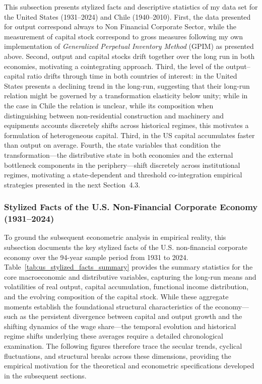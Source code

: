 This subsection presents stylized facts and descriptive statistics of my data set for the United States (1931--2024) and Chile
(1940--2010). First, the data presented for output correspond always to Non Financial Corporate Sector, while the measurement of capital stock correspond to gross measures following my own implementation of \citet{Shaikh2016} \textit{Generalized Perpetual Inventory Method} (GPIM) as presented above.  Second, output and capital stocks drift together over the long run in both economies, motivating a cointegrating approach. Third, the level of the output--capital ratio drifts through time in both countries of interest: in the United States presents a declining trend in the long-run, suggesting that their long-run relation might be governed by a transformation elasticity below unity; while in the case in Chile the relation is unclear, while its composition when distinguishing between non-residential construction and machinery and equipments accounts discretely shifts across historical regimes, this motivates a formulation of heterogeneous capital. Third, in the US capital accumulates faster than output on average. Fourth, the state variables that condition
the transformation---the distributive state in both economies and the
external bottleneck components in the periphery---shift discretely across
institutional regimes, motivating a state-dependent and threshold
co-integration empirical strategies presented in the next Section~4.3. 

\subsubsection{Stylized Facts of the U.S. Non-Financial Corporate Economy (1931--2024)}

To ground the subsequent econometric analysis in empirical reality, this subsection documents the key stylized facts of the U.S. non-financial corporate economy over the 94-year sample period from 1931 to 2024. Table~\ref{tab:us_stylized_facts_summary} provides the summary statistics for the core macroeconomic and distributive variables, capturing the long-run means and volatilities of real output, capital accumulation, functional income distribution, and the evolving composition of the capital stock. While these aggregate moments establish the foundational structural characteristics of the economy—such as the persistent divergence between capital and output growth and the shifting dynamics of the wage share—the temporal evolution and historical regime shifts underlying these averages require a detailed chronological examination. The following figures therefore trace the secular trends, cyclical fluctuations, and structural breaks across these dimensions, providing the empirical motivation for the theoretical and econometric specifications developed in the subsequent sections.


